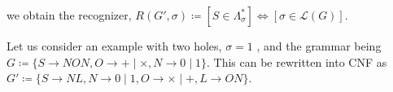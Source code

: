 \documentclass[portrait,a0b,final,a4resizeable]{a0poster}
\def\jointspacing{\vspace{0.3in}}
\begin{document}
\begin{poster}
\begin{multicols}{2}
\null\hspace*{3cm}\begin{minipage}[c]{0.85\columnwidth}
we obtain the recognizer, $R(G', \sigma) \coloneqq [S \in \Lambda^*_\sigma] \Leftrightarrow [\sigma \in \mathcal{L}(G)]$.
\end{minipage}

      \jointspacing


      \null\hspace*{3cm}\begin{minipage}[c]{0.85\columnwidth}
      Let us consider an example with two holes, $\sigma = 1$ \underline{\hspace{1cm}} \underline{\hspace{1cm}}, and the grammar being $G\coloneqq\{S\rightarrow N O N, O \rightarrow + \mid \times, N \rightarrow 0 \mid 1\}$. This can be rewritten into CNF as $G'\coloneqq \{S \rightarrow N L, N \rightarrow 0 \mid 1, O \rightarrow × \mid +, L \rightarrow O N\}$.\\
      \end{minipage}


\end{multicols}
\end{poster}
\end{document}
